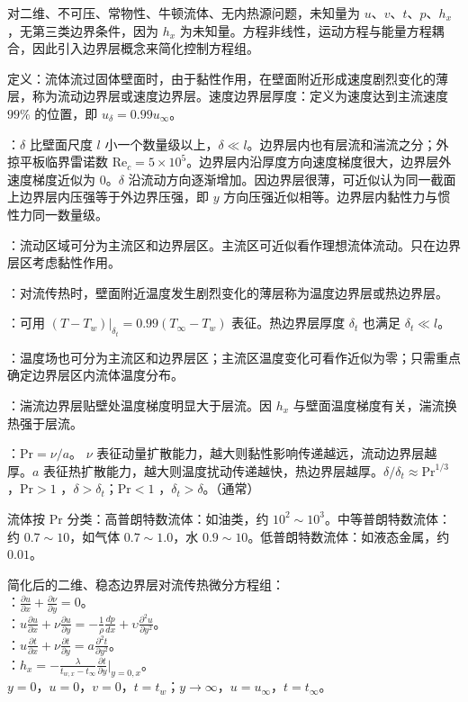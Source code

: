 对二维、不可压、常物性、牛顿流体、无内热源问题，未知量为 $u$、$v$、$t$、$p$、$h_x$，无第三类边界条件，因为 $h_x$ 为未知量。方程非线性，运动方程与能量方程耦合，因此引入边界层概念来简化控制方程组。

\divider


定义：流体流过固体壁面时，由于黏性作用，在壁面附近形成速度剧烈变化的薄层，称为流动边界层或速度边界层。速度边界层厚度：定义为速度达到主流速度 $99\%$ 的位置，即 $u_{\delta}=0.99u_{\infty}$。

：$\delta$ 比壁面尺度 $l$ 小一个数量级以上，$\delta\ll l$。边界层内也有层流和湍流之分；外掠平板临界雷诺数 $\mathrm{Re}_c=5\times 10^5$。边界层内沿厚度方向速度梯度很大，边界层外速度梯度近似为 $0$。$\delta$ 沿流动方向逐渐增加。因边界层很薄，可近似认为同一截面上边界层内压强等于外边界压强，即 $y$ 方向压强近似相等。边界层内黏性力与惯性力同一数量级。

：流动区域可分为主流区和边界层区。主流区可近似看作理想流体流动。只在边界层区考虑黏性作用。

：对流传热时，壁面附近温度发生剧烈变化的薄层称为温度边界层或热边界层。

：可用 $(T-T_w)\vert_{\delta_t}=0.99(T_{\infty}-T_w)$ 表征。热边界层厚度 $\delta_t$ 也满足 $\delta_t\ll l$。

：温度场也可分为主流区和边界层区；主流区温度变化可看作近似为零；只需重点确定边界层区内流体温度分布。

：湍流边界层贴壁处温度梯度明显大于层流。因 $h_x$ 与壁面温度梯度有关，湍流换热强于层流。

：$\mathrm{Pr}=\nu/a$。 $\nu$ 表征动量扩散能力，越大则黏性影响传递越远，流动边界层越厚。$a$ 表征热扩散能力，越大则温度扰动传递越快，热边界层越厚。$\delta/\delta_t\approx \mathrm{Pr}^{1/3}$，$\mathrm{Pr}>1$ ，$\delta>\delta_t$；$\mathrm{Pr}<1$ ，$\delta_t>\delta$。（通常）

流体按 $\mathrm{Pr}$ 分类：高普朗特数流体：如油类，约 $10^2\sim 10^3$。中等普朗特数流体：约 $0.7\sim 10$，如气体 $0.7\sim 1.0$，水 $0.9\sim 10$。低普朗特数流体：如液态金属，约 $0.01$。

简化后的二维、稳态边界层对流传热微分方程组：\\
：$\frac{\partial u}{\partial x}+\frac{\partial\nu}{\partial y}=0$。\\
：$u\frac{\partial u}{\partial x}+\nu\frac{\partial u}{\partial y}=-\frac{1}{\rho}\frac{dp}{dx}+\upsilon\frac{\partial^{2}u}{\partial y^{2}}$。\\
：$u\frac{\partial t}{\partial x}+\nu\frac{\partial t}{\partial y}=a\frac{\partial^{2}t}{\partial y^{2}}$。\\
：$h_{x}=-\frac{\lambda}{t_{w,x}-t_{\infty}}\frac{\partial t}{\partial y}|_{y=0,x}$。\\
$y=0$，$u=0$，$v=0$，$t=t_w$；$y\to\infty$，$u=u_{\infty}$，$t=t_{\infty}$。

